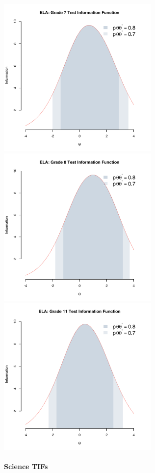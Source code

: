 \documentclass[]{article}
\let\oldparagraph\paragraph
\renewcommand{\paragraph}[1]{\oldparagraph{#1}\mbox{}}
\begin{document}
\includegraphics[width=\textwidth,height=3.125in]{tifs/ela7tif.pdf}
\includegraphics[width=\textwidth,height=3.125in]{tifs/ela8tif.pdf}
\includegraphics[width=\textwidth,height=3.125in]{tifs/ela11tif.pdf}
\newpage

\hypertarget{science-tifs}{%
\paragraph{Science TIFs}\label{science-tifs}}
\end{document}
